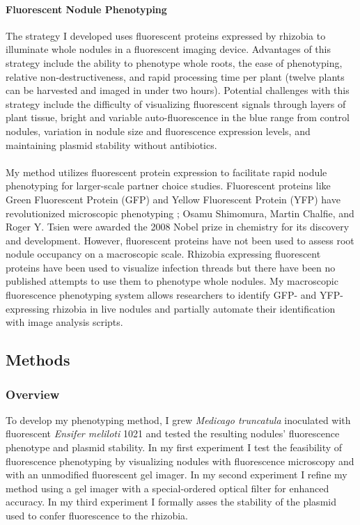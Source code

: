 \documentclass[12pt]{article}
\begin{document}
\begin{doublespace}
	\paragraph{Fluorescent Nodule Phenotyping}
The strategy I developed uses fluorescent proteins expressed by rhizobia to illuminate whole nodules in a fluorescent imaging device. Advantages of this strategy include the ability to phenotype whole roots, the ease of phenotyping, relative non-destructiveness, and rapid processing time per plant (twelve plants can be harvested and imaged in under two hours). Potential challenges with this strategy include the difficulty of visualizing fluorescent signals through layers of plant tissue, bright and variable auto-fluorescence in the blue range from control nodules, variation in nodule size and fluorescence expression levels, and maintaining plasmid stability without antibiotics.
\paragraph{}%
My method utilizes fluorescent protein expression to facilitate rapid nodule phenotyping for larger-scale partner choice studies. Fluorescent proteins like Green Fluorescent Protein (GFP) and Yellow Fluorescent Protein (YFP) have revolutionized microscopic phenotyping \cite{VanRoessel2002}; Osamu Shimomura, Martin Chalfie, and Roger Y. Tsien were awarded the 2008 Nobel prize in chemistry for its discovery and development. However, fluorescent proteins have not been used to assess root nodule occupancy on a macroscopic scale. Rhizobia expressing fluorescent proteins have been used to visualize infection threads \cite{Stuurman2000} but there have been no published attempts to use them to phenotype whole nodules. My macroscopic fluorescence phenotyping system allows researchers to identify GFP- and YFP-expressing rhizobia in live nodules and partially automate their identification with image analysis scripts.


\subsection{Methods} 

\subsubsection{Overview}
To develop my phenotyping method, I grew \textit{Medicago truncatula} inoculated with fluorescent \textit{Ensifer meliloti} 1021 and tested the resulting nodules' fluorescence phenotype and plasmid stability. In my first experiment I test the feasibility of fluorescence phenotyping by visualizing nodules with fluorescence microscopy and with an unmodified fluorescent gel imager. In my second experiment I refine my method using a gel imager with a special-ordered optical filter for enhanced accuracy. In my third experiment I formally asses the stability of the plasmid used to confer fluorescence to the rhizobia. 


\end{doublespace}
\end{document}
